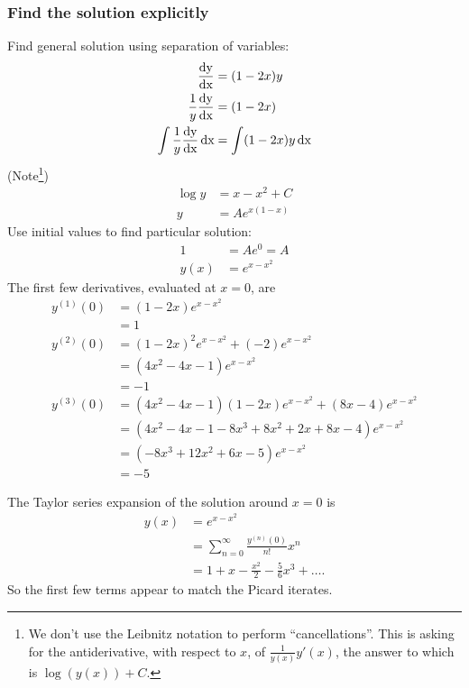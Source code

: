 \documentclass[12pt]{article}
\begin{document}
\subsubsection*{Find the solution explicitly}
Find general solution using separation of variables:
\begin{align*}
  \frac{\operatorname{\text{dy}}}{\operatorname{\text{dx}}} &= (1 - 2x)y\\
  \frac{1}{y}\frac{\operatorname{\text{dy}}}{\operatorname{\text{dx}}} &= (1 - 2x)\\
  \int \frac{1}{y} \frac{\operatorname{\text{dy}}}{\operatorname{\text{dx}}} \operatorname{\text{dx}} &= \int (1 - 2x)y \operatorname{\text{dx}}
\end{align*}
(Note\footnote{We don't use the Leibnitz notation to perform
  ``cancellations''. This is asking for the antiderivative, with respect to
  $x$, of $\frac{1}{y(x)}y'(x)$, the answer to which is $\log(y(x)) + C$.})
\begin{align*}
  \log y  &= x - x^2 + C\\
  y &= Ae^{x(1-x)}
\end{align*}
Use initial values to find particular solution:
\begin{align*}
  1 &= Ae^0 = A\\
  y(x) &= e^{x - x^2}
\end{align*}
The first few derivatives, evaluated at $x=0$, are
\begin{align*}
y^{(1)}(0) &= (1 - 2x)e^{x - x^2}\\
           &= 1\\
y^{(2)}(0) &= (1 - 2x)^2e^{x - x^2} + (-2)e^{x - x^2}\\
          &= (4x^2 - 4x - 1)e^{x - x^2}\\
           &= -1\\
y^{(3)}(0) &= (4x^2 - 4x - 1)(1 - 2x)e^{x - x^2} + (8x - 4)e^{x - x^2}\\
           &= (4x^2 - 4x - 1 - 8x^3 + 8x^2 + 2x + 8x - 4)e^{x - x^2}\\
           &= (-8x^3 +12x^2 + 6x -5)e^{x - x^2}\\
           &= -5
\end{align*}

The Taylor series expansion of the solution around $x=0$ is
\begin{align*}
  y(x) &= e^{x - x^2}\\
       &= \sum_{n=0}^\infty \frac{y^{(n)}(0)}{n!} x^n\\
       &= 1 + x - \frac{x^2}{2} - \frac{5}{6}x^3 + \ldots.
\end{align*}
So the first few terms appear to match the Picard iterates.

\end{document}
